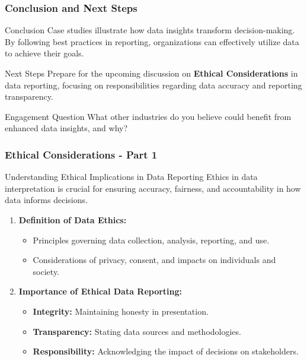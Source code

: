 \documentclass[aspectratio=169]{beamer}
\begin{document}
\begin{frame}[fragile]
    \frametitle{Conclusion and Next Steps}
    \begin{block}{Conclusion}
        Case studies illustrate how data insights transform decision-making. By following best practices in reporting, organizations can effectively utilize data to achieve their goals.
    \end{block}
    \begin{block}{Next Steps}
        Prepare for the upcoming discussion on \textbf{Ethical Considerations} in data reporting, focusing on responsibilities regarding data accuracy and reporting transparency.
    \end{block}
    \begin{block}{Engagement Question}
        What other industries do you believe could benefit from enhanced data insights, and why?
    \end{block}
\end{frame}

\begin{frame}[fragile]
    \frametitle{Ethical Considerations - Part 1}
    \begin{block}{Understanding Ethical Implications in Data Reporting}
        Ethics in data interpretation is crucial for ensuring accuracy, fairness, and accountability in how data informs decisions.
    \end{block}

    \begin{enumerate}
        \item \textbf{Definition of Data Ethics:}
        \begin{itemize}
            \item Principles governing data collection, analysis, reporting, and use.
            \item Considerations of privacy, consent, and impacts on individuals and society.
        \end{itemize}
        
        \item \textbf{Importance of Ethical Data Reporting:}
        \begin{itemize}
            \item \textbf{Integrity:} Maintaining honesty in presentation.
            \item \textbf{Transparency:} Stating data sources and methodologies.
            \item \textbf{Responsibility:} Acknowledging the impact of decisions on stakeholders.
        \end{itemize}
    \end{enumerate}
\end{frame}
\end{document}
